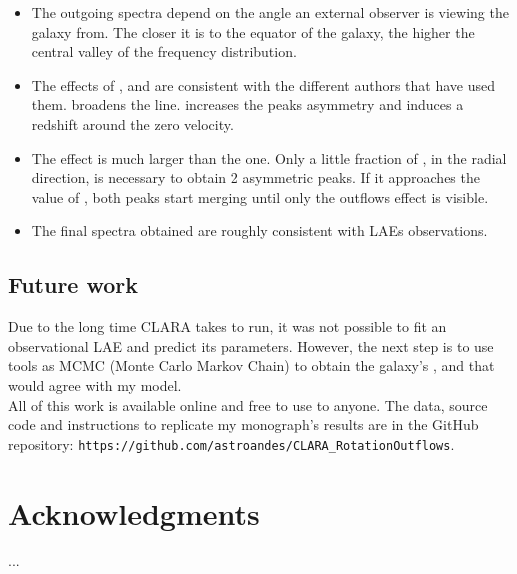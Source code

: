 \documentclass{latex/emulateapj}
\begin{document}
\begin{itemize}
	\item The outgoing spectra depend on the angle an external observer is viewing the galaxy from. The closer it is to the equator of the galaxy, the higher the central valley of the frequency distribution. \\
	
	\item The effects of \vrot, \vout and \tauh are consistent with the different authors that have used them. \vrot broadens the \lya line. \vout increases the peaks asymmetry and \tauh induces a redshift around the zero velocity.\\
	
	\item The \vrot effect is much larger than the \vout one. Only a little fraction of \vrot, in the radial direction, is necessary to obtain 2 asymmetric peaks. If it \vout approaches the value of \vrot, both peaks start merging until only the outflows effect is visible. \\
	
	\item The final spectra obtained are roughly consistent with LAEs observations.  \\
	
\end{itemize}

\subsection{Future work}

Due to the long time CLARA takes to run, it was not possible to fit an observational LAE and predict its parameters. However, the next step is to use tools as MCMC (Monte Carlo Markov Chain) to obtain the galaxy's \tauh, \vrot and \vout that would agree with my model. \\

All of this work is available online and free to use to anyone. The data, source code and instructions to replicate my monograph's results are in the GitHub repository:  \texttt{https://github.com/astroandes/CLARA\_RotationOutflows}. \\


\section*{Acknowledgments}

...\\
\end{document}
